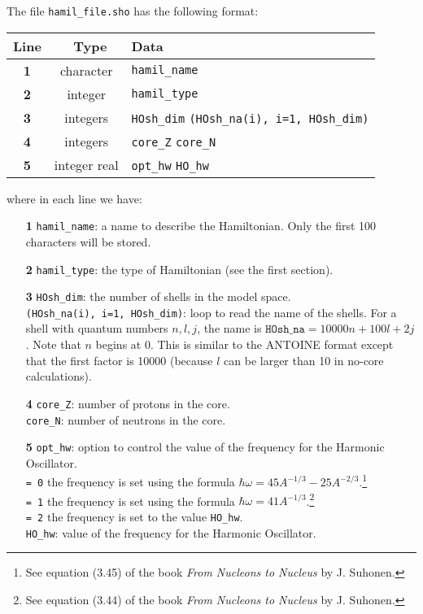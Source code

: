 \documentclass[a4paper,11pt]{article}
\renewcommand{\tt}[1]{\texttt{#1}}
\begin{document}
The file \tt{hamil\_file.sho} has the following format: 
\begin{center}
\begin{tabular}{|c|c|l|}
\hline
Line & \ Type \hfill & Data \\
\hline
 \textbf{1}   & character  & \tt{hamil\_name} \\
 \textbf{2}   & integer    & \tt{hamil\_type} \\
 \textbf{3}   & integers   & \tt{HOsh\_dim}  \: \tt{(HOsh\_na(i), i=1, HOsh\_dim)} \\
 \textbf{4}   & integers   & \tt{core\_Z} \: \tt{core\_N} \\
 \textbf{5}   & integer \: real  & \tt{opt\_hw} \: \tt{HO\_hw} \\
\hline
\end{tabular}
\end{center}
where in each line we have:
\begin{itemize}
\item[\textbf{1}] \tt{hamil\_name}: a name to describe the Hamiltonian. Only the first 100 characters will be stored.
\item[\textbf{2}] \tt{hamil\_type}: the type of Hamiltonian (see the first section). 
\item[\textbf{3}] \tt{HOsh\_dim}: the number of shells in the  model space. \\
                  \tt{(HOsh\_na(i), i=1, HOsh\_dim)}: loop to read the name of the shells. For a shell with quantum numbers $n,l,j$, the
                  name is $\tt{HOsh\_na} = 10000n + 100l + 2j$. Note that $n$ begins at 0. This is similar to the ANTOINE format except
                   that the first factor is 10000 (because $l$ can be larger than 10 in no-core calculations).
\item[\textbf{4}] \tt{core\_Z}: number of protons in the core. \\         
                  \tt{core\_N}: number of neutrons in the core.              
\item[\textbf{5}] \tt{opt\_hw}: option to control the value of the frequency for the Harmonic Oscillator. \\
                  \tt{= 0} the frequency is set using the formula $\hbar \omega = 45A^{-1/3} - 25A^{-2/3}$.\footnote{See equation (3.45) of the 
                  book \textit{From Nucleons to Nucleus} by J. Suhonen.} \\ 
                  \tt{= 1} the frequency is set using the formula $\hbar \omega = 41A^{-1/3}$.\footnote{See equation (3.44) of the 
                  book \textit{From Nucleons to Nucleus} by J. Suhonen.} \\ 
                  \tt{= 2} the frequency is set to the value \tt{HO\_hw}. \\
                  \tt{HO\_hw}: value of the frequency for the Harmonic Oscillator.
\end{itemize}
\end{document}
